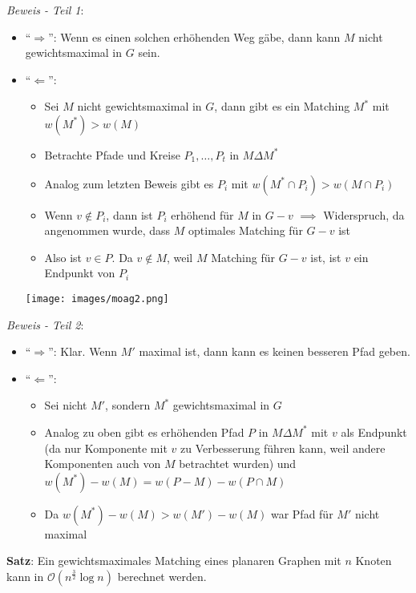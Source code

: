 \textit{Beweis - Teil 1}:
 \begin{itemize}
 	\item \enquote{$\Rightarrow$}: Wenn es einen solchen erhöhenden Weg gäbe, dann kann $M$ nicht gewichtsmaximal in $G$ sein.
 	\item \enquote{$\Leftarrow$}:
 	\begin{itemize}
 		\item Sei $M$ nicht gewichtsmaximal in $G$, dann gibt es ein Matching $M^*$ mit $w(M^*)>w(M)$
 		\item Betrachte Pfade und Kreise $P_1,\ldots,P_t$ in $M\Delta M^*$
 		\item Analog zum letzten Beweis gibt es $P_i$ mit $w(M^*\cap P_i)>w(M\cap P_i)$
 		\item Wenn $v\notin P_i$, dann ist $P_i$ erhöhend für $M$ in $G-v$ $\implies$ Widerspruch, da angenommen wurde, dass $M$ optimales Matching für $G-v$ ist
 		\item Also ist $v\in P$. Da $v\notin M$, weil $M$ Matching für $G-v$ ist, ist $v$ ein Endpunkt von $P_i$
 	\end{itemize}
	 \begin{center}
	 	\texttt{[image: images/moag2.png]}
	 \end{center}
 \end{itemize}
\bigskip
\textit{Beweis - Teil 2}: 
\begin{itemize}
	\item \enquote{$\Rightarrow$}: Klar. Wenn $M'$ maximal ist, dann kann es keinen besseren Pfad geben.
	\item \enquote{$\Leftarrow$}: 
	\begin{itemize}
		\item Sei nicht $M'$, sondern $M^*$ gewichtsmaximal in $G$
		\item Analog zu oben gibt es erhöhenden Pfad $P$ in $M\Delta M^*$ mit $v$ als Endpunkt (da nur Komponente mit $v$ zu Verbesserung führen kann, weil andere Komponenten auch von $M$ betrachtet wurden) und $w(M^*)-w(M)=w(P-M)-w(P\cap M)$
		\item Da $w(M^*)-w(M)>w(M')-w(M)$ war Pfad für $M'$ nicht maximal
	\end{itemize}
\end{itemize}
\bigskip
\textbf{Satz}: Ein gewichtsmaximales Matching eines planaren Graphen mit $n$ Knoten kann in $\mathcal{O}(n^{\frac{3}{2}}\log n)$ berechnet werden.

